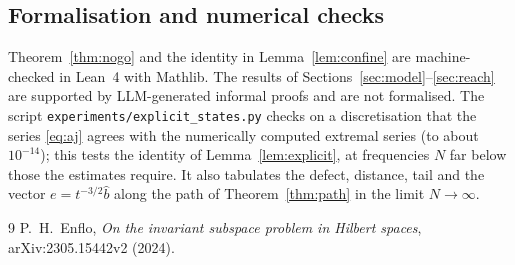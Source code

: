 \documentclass[11pt]{article}
\theoremstyle{definition}
\newcommand{\hb}{\hat b}
\begin{document}
\subsection*{Formalisation and numerical checks}
Theorem~\ref{thm:nogo} and the identity in Lemma~\ref{lem:confine} are machine-checked in
Lean~4 with Mathlib. The results of Sections~\ref{sec:model}--\ref{sec:reach} are supported by
LLM-generated informal proofs and are not formalised. The script \texttt{experiments/explicit\_states.py} checks on
a discretisation that the series \eqref{eq:aj} agrees with the numerically computed extremal
series (to about $10^{-14}$); this tests the identity of Lemma~\ref{lem:explicit}, at
frequencies $N$ far below those the estimates require. It also tabulates the defect, distance,
tail and the vector $e=t^{-3/2}\hb$ along the path of Theorem~\ref{thm:path} in the limit
$N\to\infty$.

\begin{thebibliography}{9}
 P.~H.~Enflo, \emph{On the invariant subspace problem in Hilbert spaces},
arXiv:2305.15442v2 (2024).
\end{thebibliography}
\end{document}

